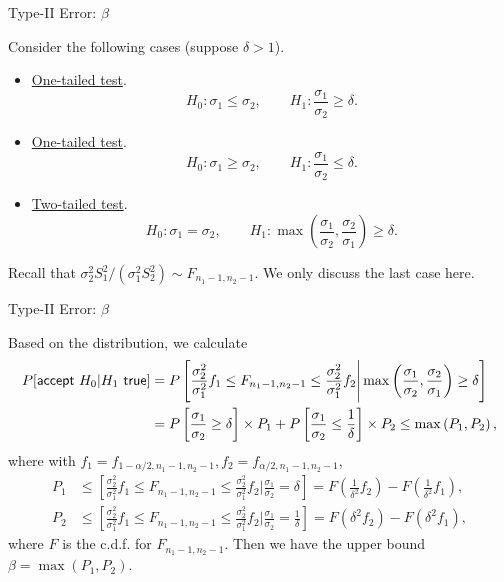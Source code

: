 \begin{frame}{Type-II Error: $\beta$}

\justifying
{} Consider the following cases (suppose $\delta > 1$).
\begin{itemize}
	\item \underline{One-tailed test}. $$H_0: \sigma_1 \leq \sigma_2,\qquad H_1: \frac{\sigma_1}{\sigma_2} \geq \delta.$$
	\item \underline{One-tailed test}. $$H_0: \sigma_1 \geq \sigma_2,\qquad H_1: \frac{\sigma_1}{\sigma_2} \leq \delta.$$
	\item \underline{Two-tailed test}. $$H_0: \sigma_1 = \sigma_2,\qquad H_1: \max\left(\frac{\sigma_1}{\sigma_2}, \frac{\sigma_2}{\sigma_1}\right) \geq \delta.$$
\end{itemize}
Recall that $\sigma_2^2S_1^2/(\sigma_1^2S_2^2) \sim F_{n_1-1,n_2-1}$. We only discuss the last case here.

\end{frame}


\begin{frame}{Type-II Error: $\beta$}

\justifying
{} Based on the distribution, we calculate
\footnotesize
\begin{align*}
P[\mathsf{accept\ } H_0|H_1 \mathsf{\ true}] & = P\left[\frac{\sigma_2^2}{\sigma_1^2}f_1 \leq F_{n_1-1,n_2-1} \leq \frac{\sigma_2^2}{\sigma_1^2}f_2\Bigg|\max\left(\frac{\sigma_1}{\sigma_2}, \frac{\sigma_2}{\sigma_1}\right) \geq \delta \right] \\
& = P\left[\frac{\sigma_1}{\sigma_2} \geq \delta \right]\times P_1 + P\left[\frac{\sigma_1}{\sigma_2} \leq \frac{1}{\delta} \right]\times P_2 \leq \max\left(P_1, P_2 \right),
\end{align*}
\normalsize
where with $f_1 = f_{1-\alpha/2,n_1-1,n_2-1}, f_2 = f_{\alpha/2,n_1-1,n_2-1}$,
\footnotesize
\begin{align*}
P_1 & \leq \left[\frac{\sigma_2^2}{\sigma_1^2}f_1 \leq F_{n_1-1,n_2-1} \leq \frac{\sigma_2^2}{\sigma_1^2}f_2\Bigg|\frac{\sigma_1}{\sigma_2} = \delta \right] = F\left(\frac{1}{\delta^2} f_2 \right) - F\left(\frac{1}{\delta^2} f_1 \right), \\
P_2 & \leq \left[\frac{\sigma_2^2}{\sigma_1^2}f_1 \leq F_{n_1-1,n_2-1} \leq \frac{\sigma_2^2}{\sigma_1^2}f_2\Bigg|\frac{\sigma_1}{\sigma_2} = \frac{1}{\delta} \right] = F\left(\delta^2 f_2 \right) - F\left(\delta^2 f_1 \right),
\end{align*}
\normalsize
where $F$ is the c.d.f. for $F_{n_1-1,n_2-1}$. Then we have the upper bound $\beta = \max(P_1, P_2)$.

\end{frame}


